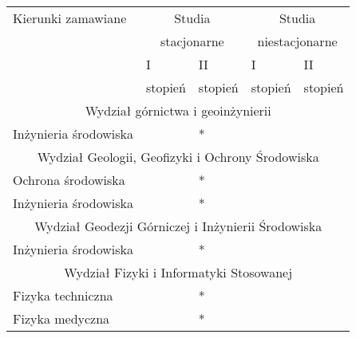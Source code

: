 \documentclass[a4paper]{article}
\begin{document}
\begin{table}[ht]
\begin{center}
\begin{longtable}{|p{6cm}|p{}|p{}|p{}|p{}|}

\hline

\centerline{Kierunki zamawiane} & \multicolumn{2}{|c|}{Studia} & \multicolumn{2}{|c|}{Studia}\\
 & \multicolumn{2}{|c|}{stacjonarne} & \multicolumn{2}{|c|}{niestacjonarne}\\
\cline{2-5}

 & I & II & I & II\\
 & stopień & stopień & stopień & stopień\\

\hline
\multicolumn{5}{|c|}{Wydział górnictwa i geoinżynierii}\\
\hline
Inżynieria środowiska & & * & & \\
\hline
\multicolumn{5}{|c|}{Wydział Geologii, Geofizyki i Ochrony Środowiska}\\
\hline
Ochrona środowiska & & * & &\\
\hline
Inżynieria środowiska & & * & & \\
\hline
\multicolumn{5}{|c|}{Wydział Geodezji Górniczej i Inżynierii Środowiska}\\
\hline
Inżynieria środowiska & & * & & \\
\hline
\multicolumn{5}{|c|}{Wydział Fizyki i Informatyki Stosowanej}\\
\hline
Fizyka techniczna & & * & &\\
\hline
Fizyka medyczna & & * & & \\
\hline
\end{longtable}
\end{center}
\end{table}
\end{document}
